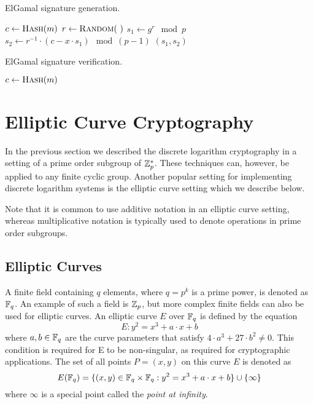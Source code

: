 \begin{algorithm}
  \caption{ElGamal signature generation.}
  \label{alg:ElGamal-sign}
  \addtolength{\baselineskip}{1mm}
  \begin{algorithmic}[1]
      \State $c \gets \Call{Hash}{m}$
      \State $r \gets \Call{Random}{~}$
      \State $s_1 \gets g^r \mod p$
      \State $s_2 \gets r^{-1} \cdot (c - x \cdot s_1) \mod (p - 1)$
      \Return $(s_1, s_2)$
    \EndFunction
  \end{algorithmic}
\end{algorithm}
\begin{algorithm}
  \caption{ElGamal signature verification.}
  \label{alg:ElGamal-verify}
  \addtolength{\baselineskip}{1mm}
  \begin{algorithmic}[1]
      \State $c \gets \Call{Hash}{m}$
        \Return {}
      \EndIf
      \Return {}
    \EndFunction
  \end{algorithmic}
\end{algorithm}

\section{Elliptic Curve Cryptography}

In the previous section we described the discrete logarithm cryptography in a
setting of a prime order subgroup of $\mathbb{Z}^*_p$. These techniques can, however,
be applied to any finite cyclic group. Another popular setting for implementing
discrete logarithm systems is the elliptic curve setting which we describe below.

Note that it is common to use additive notation in an elliptic curve setting,
whereas multiplicative notation is typically used to denote operations in prime
order subgroups.

\subsection{Elliptic Curves}

A finite field containing $q$ elements, where $q = p^k$ is a prime power, is
denoted as $\mathbb{F}_{q}$. An example of such a field is $\mathbb{Z}_p$, but more complex
finite fields can also be used for elliptic curves. An elliptic curve $E$ over
$\mathbb{F}_{q}$ is defined by the equation
\begin{equation}\label{eqn:elliptic_curve}
  E: y^2 = x^3 + a \cdot x + b
\end{equation}
where $a, b \in \mathbb{F}_{q}$ are the curve parameters that satisfy
$4 \cdot a^3 + 27 \cdot b^2 \neq 0$. This condition is required for E to be
non-singular, as required for cryptographic applications. The set of all points
$P = (x, y)$ on this curve $E$ is denoted as
\begin{equation*}
  E(\mathbb{F}_{q}) = \{ (x, y) \in \mathbb{F}_{q} \times \mathbb{F}_{q} : y^2 = x^3 + a \cdot x + b \}
                         \cup \{ \infty \}
\end{equation*}
where $\infty$ is a special point called the \emph{point at infinity}.

